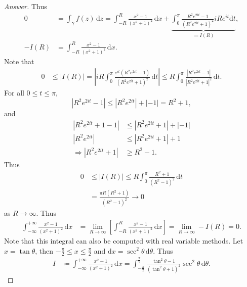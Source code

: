\documentclass[12pt]{article}
\newcommand\paren[1]{\left( #1 \right)}
\newcommand{\sqbrack}[1]{\left [ #1 \right ]}
\newcommand{\abs}[1]{\left| #1 \right|}
\theoremstyle{definition}
\begin{document}
\begin{proof}[Answer]
    Thus
    \begin{align*}
        0 & = \int_{\gamma} f(z) \, \mathrm{d}z = \int_{-R}^R \frac{x^2 - 1}{\paren{x^2+1}^2} \, \mathrm{d}x + \underbrace{ \int_0^{\pi} \frac{R^2 e^{2it} - 1}{ \paren{ R^2 e^{2it} + 1 }^2  } iR e^{it} \mathrm{d}t }_{ \eqqcolon I(R) } , \\
        -I(R) & = \int_{-R}^R \frac{x^2 - 1}{\paren{x^2+1}^2} \, \mathrm{d}x .
    \end{align*}
    Note that 
    \begin{align*}
        0 & \leq |I(R)| = \left| iR \int_0^{\pi} \frac {e^{it} \paren{ R^2 e^{2it} - 1 } }{ \paren{ R^2 e^{2it} + 1 }^2 } \, \mathrm{d} t \right| \leq R \int_0^{\pi} \frac{ \left| R^2 e^{2it} - 1 \right| }{ \left| R^2 e^{2it} + 1 \right|^2 } \, \mathrm{d} t.
    \end{align*}
    For all $0 \leq t \leq \pi$, 
    \[
        \left| R^2 e^{2it} - 1 \right| \leq \left| R^2 e^{2it} \right| + |-1| = R^2 + 1,
    \]
    and 
    \begin{align*}
        \left| R^2 e^{2it} + 1 - 1 \right| & \leq \left| R^2 e^{2it} + 1 \right| + | -1 | \\
        \left| R^2 e^{2it} \right| & \leq \left| R^2 e^{2it} + 1 \right| + 1 \\
        \Rightarrow \abs{ R^2 e^{2it} + 1 } & \geq R^2 - 1.
    \end{align*}
    Thus 
    \begin{align*}
        0 & \leq |I(R)| \leq R \int_0^{\pi} \frac{R^2 + 1}{ \paren{ R^2 - 1 }^2 } \, \mathrm{d}t \\
        & = \frac{ \pi R \paren{ R^2 + 1 } }{ \paren{ R^2 - 1 }^2 } \to 0
    \end{align*}
    as $R \to \infty$. Thus 
    \begin{align*}
        \int_{-\infty}^{+\infty} \frac{x^2 - 1}{(x^2+1)^2} \, \mathrm{d}x & = \lim\limits_{R \to \infty} \sqbrack{ \int_{-R}^R \frac{x^2 - 1}{\paren{x^2+1}^2} \, \mathrm{d}x } = \lim\limits_{R \to \infty} -I(R) = \boxed{ 0. }
    \end{align*}
    Note that this integral can also be computed with real variable methods. Let $x = \tan \theta$, then $ -\frac{\pi}{2} \leq x \leq \frac{\pi}{2}$ and $\mathrm{d} x = \sec^2 \theta \, \mathrm{d}\theta$. Thus 
    \begin{align*}
        I & \coloneqq \int_{-\infty}^{+\infty} \frac{x^2 - 1}{(x^2+1)^2} \, \mathrm{d}x = \int_{-\frac{\pi}{2}}^{\frac{\pi}{2}} \frac{ \tan^2 \theta - 1 }{ \paren{ \tan^2 \theta + 1 }^2 } \sec^2 \theta \, \mathrm{d} \theta.

\end{align*}
\end{proof}
\end{document}

